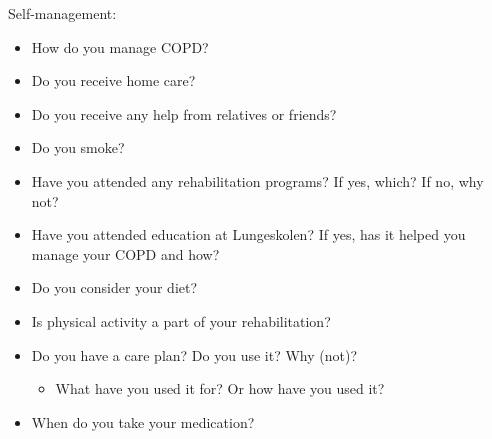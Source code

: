 Self-management:
\begin{itemize}
	\item How do you manage COPD?
	\item Do you receive home care?
	\item Do you receive any help from relatives or friends?
	\item Do you smoke?
	\item Have you attended any rehabilitation programs? If yes, which? If no, why not?
	\item Have you attended education at Lungeskolen? If yes, has it helped you manage your COPD and how?
	\item Do you consider your diet?
	\item Is physical activity a part of your rehabilitation?
	\item Do you have a care plan? Do you use it? Why (not)?
	\begin{itemize}
		\item What have you used it for? Or how have you used it?
	\end{itemize}
	\item When do you take your medication?
\end{itemize}

